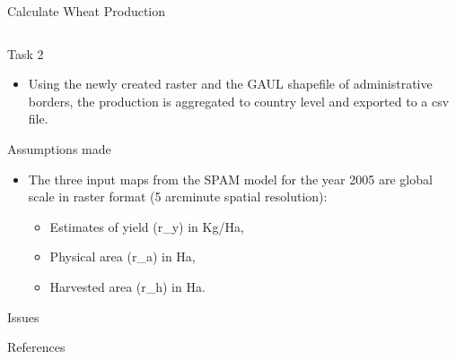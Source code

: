 \documentclass[
  ignorenonframetext,
  aspectratio=169,
]{beamer}
\newif\ifbibliography
\providecommand{\tightlist}{%
  \setlength{\itemsep}{0pt}\setlength{\parskip}{0pt}}\usepackage{longtable,booktabs,array}
\begin{document}
\begin{frame}[fragile]{Calculate Wheat Production}
\begin{columns}[T]
\begin{column}{0.8\textwidth}
\linespread{2}
\end{column}
\end{columns}
\end{frame}

\begin{frame}{Task 2}
\protect\hypertarget{task-2}{}
\begin{itemize}[<+->]
\tightlist
\item
  Using the newly created raster and the GAUL shapefile of
  administrative borders, the production is aggregated to country level
  and exported to a csv file.
\end{itemize}
\end{frame}

\begin{frame}{Assumptions made}
\protect\hypertarget{assumptions-made}{}
\begin{itemize}[<+->]
\tightlist
\item
  The three input maps from the SPAM model for the year 2005 are global
  scale in raster format (5 arcminute spatial resolution):

  \begin{itemize}[<+->]
  \tightlist
  \item
    Estimates of yield (r\_y) in Kg/Ha,
  \item
    Physical area (r\_a) in Ha,
  \item
    Harvested area (r\_h) in Ha.
  \end{itemize}
\end{itemize}
\end{frame}

\begin{frame}{Issues}
\protect\hypertarget{issues}{}
\end{frame}

\begin{frame}{References}
\protect\hypertarget{references}{}
\renewcommand{\bibsection}{}


\linespread{0.5}

\linespread{2}
\end{frame}


\begin{frame}[allowframebreaks]{}
  \bibliographytrue
\end{frame}
\end{document}
